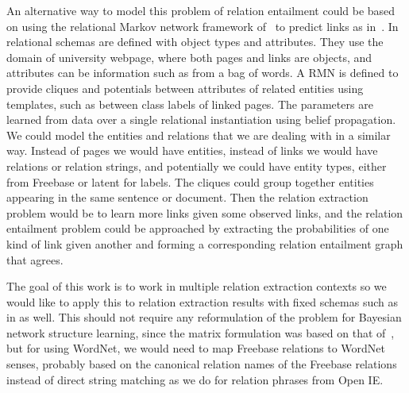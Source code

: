 \documentclass{article}
\begin{document}
An alternative way to model this problem of relation entailment could be based on using the relational Markov network framework of~\cite{Taskar:2002:DPM:2073876.2073934} to predict links as in~\cite{TaskarWAK03}. In~\cite{TaskarWAK03} relational schemas are defined with object types and attributes. They use the domain of university webpage, where both pages and links are objects, and attributes can be information such as from a bag of words. A RMN is defined to provide cliques and potentials between attributes of related entities using templates, such as between class labels of linked pages. The parameters are learned from data over a single relational instantiation using belief propagation. We could model the entities and relations that we are dealing with in a similar way. Instead of pages we would have entities, instead of links we would have relations or relation strings, and potentially we could have entity types, either from Freebase or latent for labels. The cliques could group together entities appearing in the same sentence or document. Then the relation extraction problem would be to learn more links given some observed links, and the relation entailment problem could be approached by extracting the probabilities of one kind of link given another and forming a corresponding relation entailment graph that agrees.

The goal of this work is to work in multiple relation extraction contexts so we would like to apply this to relation extraction results with fixed schemas such as in \cite{HoffmannZLZW11, riedel13relation} as well. This should not require any reformulation of the problem for Bayesian network structure learning, since the matrix formulation was based on that of~\cite{riedel13relation}, but for using WordNet, we would need to map Freebase relations to WordNet senses, probably based on the canonical relation names of the Freebase relations instead of direct string matching as we do for relation phrases from Open IE.



\end{document}
